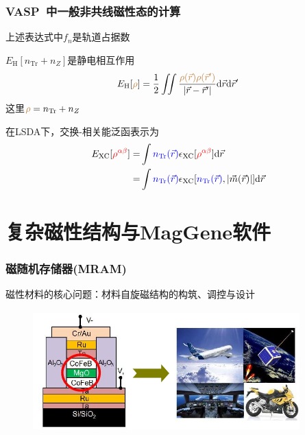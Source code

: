 \documentclass[cjk,slidestop,compress,mathserif,blue]{beamer}
\begin{document}
\frame
{
	\frametitle{\textrm{VASP~}中一般非共线磁性态的计算}
	上述表达式中$f_n$是轨道占据数
	
	$E_{\mathrm{H}}[n_{\mathrm{Tr}}+n_Z]$是静电相互作用
	\begin{displaymath}
		E_{\mathrm{H}}[\textcolor{brown}{\rho}]=\frac12\iint\frac{\textcolor{brown}{\rho(\vec r)\rho(\vec r^{\prime})}}{|\vec r-\vec r^{\prime}|}\mathrm{d}\vec r\mathrm{d}\vec r^{\prime}
	\end{displaymath}
	这里$\textcolor{brown}{\rho}=n_{\mathrm{Tr}}+n_Z$

	在\textrm{LSDA}下，交换-相关能泛函表示为
	\begin{displaymath}
		\begin{aligned}
			E_{\mathrm{XC}}[\textcolor{red}{\rho^{\alpha\beta}}]=&\int\textcolor{blue}{n_{\mathrm{Tr}}(\vec r)}\epsilon_{\mathrm{XC}}[\textcolor{red}{\rho^{\alpha\beta}}]\mathrm{d}\vec r\\
			=&\int\textcolor{blue}{n_{\mathrm{Tr}}(\vec r)}\epsilon_{\mathrm{XC}}[\textcolor{blue}{n_{\mathrm{Tr}}(\vec r)},|\vec m(\vec r)|]\mathrm{d}\vec r
		\end{aligned}
	\end{displaymath}
}

\section{复杂磁性结构与\rm{MagGene}软件}
\frame
{
	\frametitle{磁随机存储器\textrm{(MRAM)}}
磁性材料的核心问题：材料自旋磁结构的构筑、调控与设计
\begin{figure}[h!]
\centering
\includegraphics[height=1.85in,width=4.05in]{Figures/MRAM-Devices.png}
\label{Fig:MRAM-Devices}
\end{figure}
}
\end{document}
